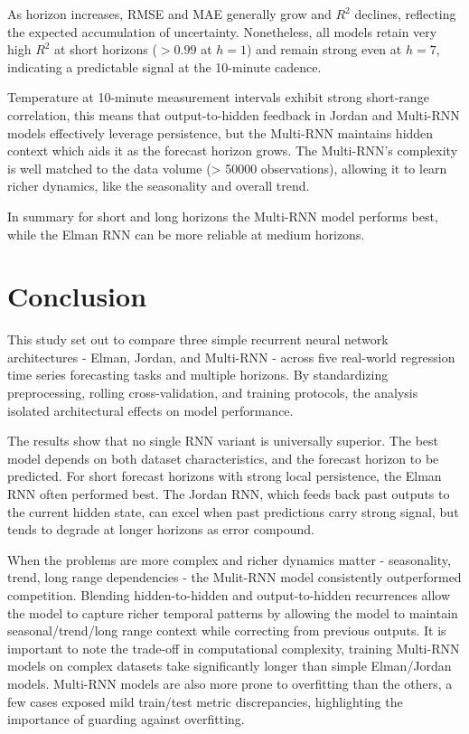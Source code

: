 \documentclass[conference]{IEEEtran}
\begin{document}
As horizon increases, RMSE and MAE generally grow and $R^2$ declines, reflecting the expected accumulation of uncertainty. Nonetheless, all models retain very high $R^2$ at short horizons ($>0.99$ at $h{=}1$) and remain strong even at $h{=}7$, indicating a predictable signal at the 10-minute cadence.

Temperature at 10-minute measurement intervals exhibit strong short-range correlation, this means that output-to-hidden feedback in Jordan and Multi-RNN models effectively leverage persistence, but the Multi-RNN maintains hidden context which aids it as the forecast horizon grows. The Multi-RNN's complexity is well matched to the data volume (> 50000 observations), allowing it to learn richer dynamics, like the seasonality and overall trend.

In summary for short and long horizons the Multi-RNN model performs best, while the Elman RNN can be more reliable at medium horizons.

\section{\textbf{Conclusion}}

This study set out to compare three simple recurrent neural network architectures - Elman, Jordan, and Multi-RNN - across five real-world regression time series forecasting tasks and multiple horizons. By standardizing preprocessing, rolling cross-validation, and training protocols, the analysis isolated architectural effects on model performance.

The results show that no single RNN variant is universally superior. The best model depends on both dataset characteristics, and the forecast horizon to be predicted. For short forecast horizons with strong local persistence, the Elman RNN often performed best. The Jordan RNN, which feeds back past outputs to the current hidden state, can excel when past predictions carry strong signal, but tends to degrade at longer horizons as error compound.

When the problems are more complex and richer dynamics matter - seasonality, trend, long range dependencies - the Mulit-RNN model consistently outperformed competition. Blending hidden-to-hidden and output-to-hidden recurrences allow the model to capture richer temporal patterns by allowing the model to maintain seasonal/trend/long range context while correcting from previous outputs. It is important to note the trade-off in computational complexity, training Multi-RNN models on complex datasets take significantly longer than simple Elman/Jordan models. Multi-RNN models are also more prone to overfitting than the others, a few cases exposed mild train/test metric discrepancies, highlighting the importance of guarding against overfitting.
\end{document}
